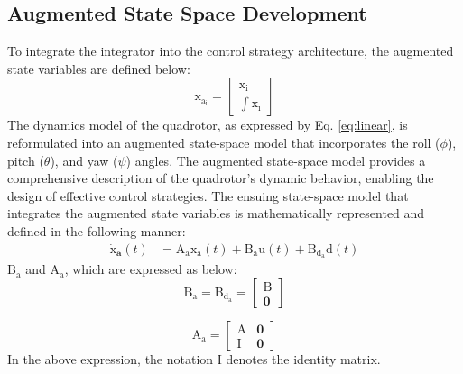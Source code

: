 \documentclass[preprint,12pt,authoryear]{elsarticle}
\begin{document}
\subsection{Augmented State Space Development}
\noindent To integrate the integrator into the control strategy architecture, the augmented state variables are defined below:
\begin{equation}\label{lqidg_x}
    \boldsymbol{\mathrm{x_{a_i}}} = \begin{bmatrix}
        \boldsymbol{\mathrm{x_i}} \\[1em]
        \displaystyle\int\boldsymbol{\mathrm{x_i}}
    \end{bmatrix}
\end{equation}
The dynamics model of the quadrotor, as expressed by Eq. \eqref{eq:linear}, is reformulated into an augmented state-space model that incorporates the roll ($\phi$), pitch ($\theta$), and yaw ($\psi$) angles. The augmented state-space model provides a comprehensive description of the quadrotor's dynamic behavior, enabling the design of effective control strategies. The ensuing state-space model that integrates the augmented state variables is mathematically represented and defined in the following manner:
\begin{equation}\label{systemlqidg}
	\begin{split}
		\boldsymbol{\dot{\mathrm{x}}_a}(t) &= \boldsymbol{\mathrm{A_ax_a}}(t) + \boldsymbol{\mathrm{B_{{a}}u}}(t) + \boldsymbol{\mathrm{B_{{d_a}}d}}(t)%
	\end{split}
\end{equation}
$\boldsymbol{\mathrm{B_a}}$ and $\boldsymbol{\mathrm{A_a}}$, which are expressed as below:
\begin{equation}
	\boldsymbol{\mathrm{B_a}} = \boldsymbol{\mathrm{B_{{d_a}}}} = \begin{bmatrix}
		\boldsymbol{\mathrm{B}}\\
		\boldsymbol{0}
	\end{bmatrix}
\end{equation}

\begin{equation}
	\boldsymbol{\mathrm{A_a}} = \begin{bmatrix}
		\boldsymbol{\mathrm{A}} & \boldsymbol{0}\\
		\boldsymbol{\mathrm{I}} & \boldsymbol{0}
	\end{bmatrix}
\end{equation}
In the above expression, the notation $\boldsymbol{\mathrm{I}}$ denotes the identity matrix.
\end{document}
